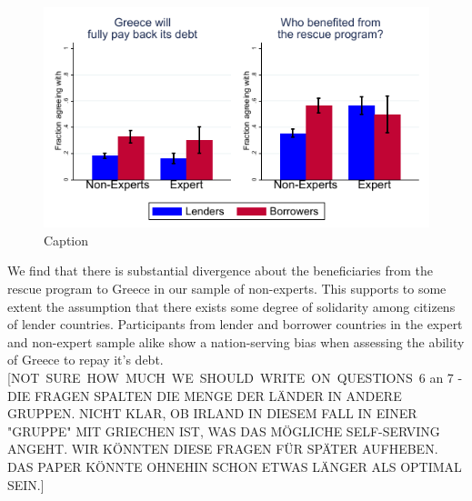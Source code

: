 \begin{figure}[h!]
    \centering
    \includegraphics[scale=1.2]{graph6.pdf}
    \caption{Caption}
    \label{fig:my_label}
\end{figure}


We find that there is substantial divergence about the beneficiaries from the rescue program to Greece in our sample of non-experts. This supports to some 
extent the assumption that there exists some degree of solidarity among citizens of lender countries. 
Participants from lender and borrower countries in the expert and non-expert sample alike show a nation-serving bias when assessing the ability of Greece to repay it's debt. 
[NOT\ SURE\ HOW\ MUCH\ WE\ SHOULD\ WRITE\ ON\ QUESTIONS\ 6 an 7 - DIE FRAGEN
SPALTEN DIE MENGE DER L\"{A}NDER IN ANDERE GRUPPEN. NICHT KLAR, OB IRLAND IN
DIESEM FALL IN EINER "GRUPPE" MIT GRIECHEN IST, WAS DAS M\"{O}GLICHE
SELF-SERVING ANGEHT. WIR K\"{O}NNTEN DIESE FRAGEN F\"{U}R SP\"{A}TER
AUFHEBEN. DAS PAPER K\"{O}NNTE OHNEHIN SCHON ETWAS L\"{A}NGER ALS OPTIMAL
SEIN.]